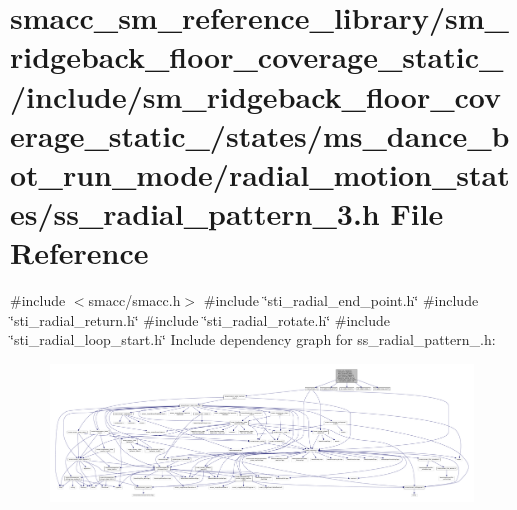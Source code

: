 \hypertarget{sm__ridgeback__floor__coverage__static__1_2include_2sm__ridgeback__floor__coverage__static__1_2sf08e03c6180dfd8d6fb5e9e0d5819bd3}{}\section{smacc\+\_\+sm\+\_\+reference\+\_\+library/sm\+\_\+ridgeback\+\_\+floor\+\_\+coverage\+\_\+static\+\_/include/sm\+\_\+ridgeback\+\_\+floor\+\_\+coverage\+\_\+static\+\_/states/ms\+\_\+dance\+\_\+bot\+\_\+run\+\_\+mode/radial\+\_\+motion\+\_\+states/ss\+\_\+radial\+\_\+pattern\+\_\+3.h File Reference}
\label{sm__ridgeback__floor__coverage__static__1_2include_2sm__ridgeback__floor__coverage__static__1_2sf08e03c6180dfd8d6fb5e9e0d5819bd3}
{\ttfamily \#include $<$smacc/smacc.\+h$>$}\newline
{\ttfamily \#include \char`\"{}sti\+\_\+radial\+\_\+end\+\_\+point.\+h\char`\"{}}\newline
{\ttfamily \#include \char`\"{}sti\+\_\+radial\+\_\+return.\+h\char`\"{}}\newline
{\ttfamily \#include \char`\"{}sti\+\_\+radial\+\_\+rotate.\+h\char`\"{}}\newline
{\ttfamily \#include \char`\"{}sti\+\_\+radial\+\_\+loop\+\_\+start.\+h\char`\"{}}\newline
Include dependency graph for ss\+\_\+radial\+\_\+pattern\+\_.\+h\+:
\nopagebreak
\begin{figure}[H]
\begin{center}
\leavevmode
\includegraphics[width=350pt]{sm__ridgeback__floor__coverage__static__1_2include_2sm__ridgeback__floor__coverage__static__1_2sceade189e8efad44de3edb5eeb18e8b1}
\end{center}
\end{figure}
